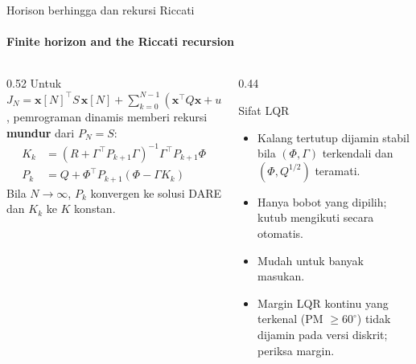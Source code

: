 \documentclass[aspectratio=169,10pt]{beamer}
\begin{document}
\begin{frame}{Horison berhingga dan rekursi Riccati}
	\framesubtitle{Finite horizon and the Riccati recursion}
	\begin{columns}[T]
		\begin{column}{0.52\textwidth}
			\small
			Untuk $J_N = \mathbf{x}[N]^\top S\,\mathbf{x}[N] + \sum_{k=0}^{N-1}(\mathbf{x}^\top Q\mathbf{x} + u^\top Ru)$, pemrograman dinamis memberi rekursi \textbf{mundur} dari $P_N = S$:
			\begin{align*}
				K_k &= (R + \Gamma^\top P_{k+1}\Gamma)^{-1}\Gamma^\top P_{k+1}\Phi\\
				P_k &= Q + \Phi^\top P_{k+1}(\Phi - \Gamma K_k)
			\end{align*}
			Bila $N \to \infty$, $P_k$ konvergen ke solusi DARE dan $K_k$ ke $K$ konstan.
		\end{column}
		\begin{column}{0.44\textwidth}
			\begin{block}{Sifat LQR}
				\small
				\begin{itemize}
					\item Kalang tertutup dijamin stabil bila $(\Phi,\Gamma)$ terkendali dan $(\Phi, Q^{1/2})$ teramati.
					\item Hanya bobot yang dipilih; kutub mengikuti secara otomatis.
					\item Mudah untuk banyak masukan.
					\item Margin LQR kontinu yang terkenal (PM $\ge 60^\circ$) \alert{tidak dijamin} pada versi diskrit; periksa margin.
				\end{itemize}
			\end{block}
		\end{column}
	\end{columns}
\end{frame}
\end{document}
